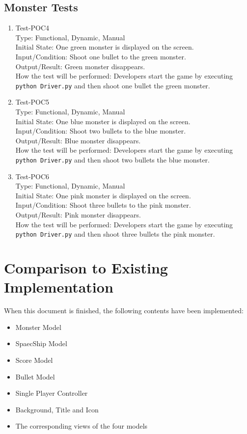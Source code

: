 \documentclass[12pt]{article}
\begin{document}
\subsection{Monster Tests}
\begin{enumerate}[1.]
\item Test-POC4\\
Type: Functional, Dynamic, Manual\\
Initial State: One green monster is displayed on the screen.\\
Input/Condition: Shoot one bullet to the green monster.\\
Output/Result: Green monster disappears.\\
How the test will be performed: Developers start the 
game by executing \verb|python Driver.py| and then shoot
one bullet the green monster.
\item Test-POC5\\
Type: Functional, Dynamic, Manual\\
Initial State: One blue monster is displayed on the screen.\\
Input/Condition: Shoot two bullets to the blue monster.\\
Output/Result: Blue monster disappears.\\
How the test will be performed: Developers start the 
game by executing \verb|python Driver.py| and then shoot
two bullets the blue monster.
\item Test-POC6\\
Type: Functional, Dynamic, Manual\\
Initial State: One pink monster is displayed on the screen.\\
Input/Condition: Shoot three bullets to the pink monster.\\
Output/Result: Pink monster disappears.\\
How the test will be performed: Developers start the 
game by executing \verb|python Driver.py| and then shoot
three bullets the pink monster.
\end{enumerate}
\section{Comparison to Existing  Implementation}
When this document is finished, the following contents
have been implemented:
\begin{itemize}
\item Monster Model
\item SpaecShip Model
\item Score Model
\item Bullet Model
\item Single Player Controller
\item Background, Title and Icon
\item The corresponding views of the four models
\end{itemize}
\end{document}
